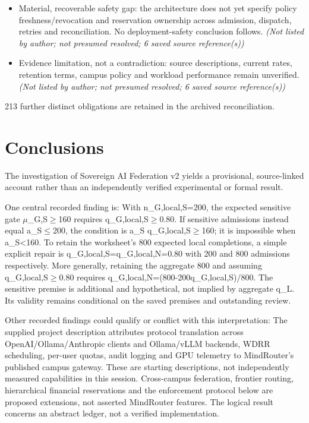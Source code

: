 \documentclass[11pt]{article}
\begin{document}
\begin{itemize}
\item Material, recoverable safety gap: the architecture does not yet specify policy freshness/revocation and reservation ownership across admission, dispatch, retries and reconciliation. No deployment-safety conclusion follows. \textit{ (Not listed by author; not presumed resolved; 6 saved source reference(s))}
\item Evidence limitation, not a contradiction: source descriptions, current rates, retention terms, campus policy and workload performance remain unverified. \textit{ (Not listed by author; not presumed resolved; 6 saved source reference(s))}
\end{itemize}
213 further distinct obligations are retained in the archived reconciliation.
\section{Conclusions}
The investigation of Sovereign AI Federation v2 yields a provisional, source-linked account rather than an independently verified experimental or formal result.

One central recorded finding is: With n\_G,local,S=200, the expected sensitive gate $\mu$\_G,S$\geq$160 requires q\_G,local,S$\geq$0.80. If sensitive admissions instead equal a\_S$\leq$200, the condition is a\_S q\_G,local,S$\geq$160; it is impossible when a\_S\textless{}160. To retain the worksheet's 800 expected local completions, a simple explicit repair is q\_G,local,S=q\_G,local,N=0.80 with 200 and 800 admissions respectively. More generally, retaining the aggregate 800 and assuming q\_G,local,S$\geq$0.80 requires q\_G,local,N=(800-200q\_G,local,S)/800. The sensitive premise is additional and hypothetical, not implied by aggregate q\_L. Its validity remains conditional on the saved premises and outstanding review.

Other recorded findings could qualify or conflict with this interpretation: The supplied project description attributes protocol translation across OpenAI/Ollama/Anthropic clients and Ollama/vLLM backends, WDRR scheduling, per-user quotas, audit logging and GPU telemetry to MindRouter's published campus gateway. These are starting descriptions, not independently measured capabilities in this session. Cross-campus federation, frontier routing, hierarchical financial reservations and the enforcement protocol below are proposed extensions, not asserted MindRouter features. The logical result concerns an abstract ledger, not a verified implementation.
\end{document}
